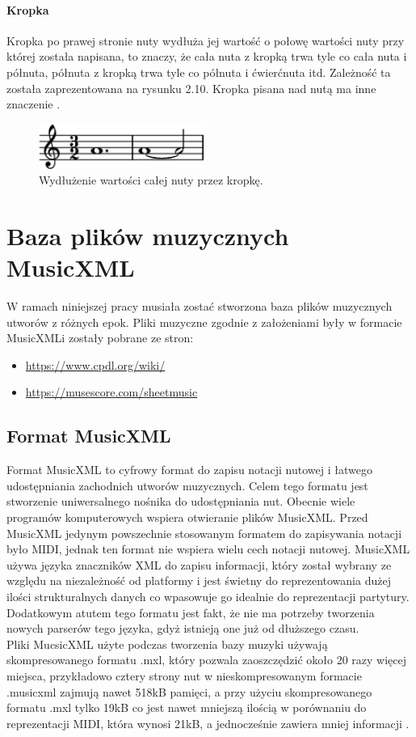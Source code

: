 \documentclass[printmode, eng]{mgr}
\newcommand\tab[1][1cm]{\hspace*{#1}}
\begin{document}
\subsubsection{Kropka}
\tab Kropka po prawej stronie nuty wydłuża jej wartość o połowę wartości nuty przy której została napisana, to znaczy, że cała nuta z kropką trwa tyle co cała nuta i półnuta, półnuta z kropką trwa tyle co półnuta i ćwierćnuta itd. Zależność ta została zaprezentowana na rysunku 2.10. Kropka pisana nad nutą ma inne znaczenie \cite{wart}.

\begin{figure}[!htb]
\centering
\includegraphics[width=5.4cm]{kropka}
\caption{Wydłużenie wartości całej nuty przez kropkę.}
\end{figure}

\chapter{Baza plików muzycznych MusicXML}
\tab W ramach niniejszej pracy musiała zostać stworzona baza plików muzycznych utworów z różnych epok. Pliki muzyczne zgodnie z założeniami były w formacie MusicXML\linebreak i zostały pobrane ze stron:
\begin{itemize}
\item \url{https://www.cpdl.org/wiki/}
\item \url{https://musescore.com/sheetmusic}
\end{itemize}
\section{Format MusicXML}
\tab Format MusicXML to cyfrowy format do zapisu notacji nutowej i łatwego udostępniania zachodnich utworów muzycznych. Celem tego formatu jest stworzenie uniwersalnego nośnika do udostępniania nut. Obecnie wiele programów komputerowych wspiera otwieranie plików MusicXML. Przed MusicXML jedynym powszechnie stosowanym formatem do zapisywania notacji było MIDI, jednak ten format nie wspiera wielu cech notacji nutowej. MusicXML używa języka znaczników XML \cite{xml} do zapisu informacji, który został wybrany ze względu na niezależność od platformy i jest świetny do reprezentowania dużej ilości strukturalnych danych co wpasowuje go idealnie do reprezentacji partytury. Dodatkowym atutem tego formatu jest fakt, że nie ma potrzeby tworzenia nowych parserów tego języka, gdyż istnieją one już od dłuższego czasu.\\
\tab Pliki MucsicXML użyte podczas tworzenia bazy muzyki używają skompresowanego formatu .mxl, który pozwala zaoszczędzić około 20 razy więcej miejsca, przykładowo cztery strony nut w nieskompresowanym formacie .musicxml zajmują nawet 518kB pamięci, a przy użyciu skompresowanego formatu .mxl tylko 19kB co jest nawet mniejszą ilością w porównaniu do reprezentacji MIDI, która wynosi 21kB, a jednocześnie zawiera mniej informacji \cite{mxml}. 
\end{document}
